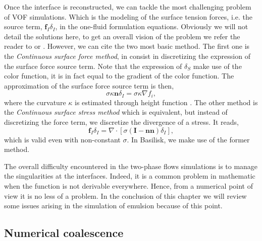 Once the interface is reconstructed, we can tackle the most challenging problem of VOF simulations.
Which is the modeling of the surface tension forces, i.e. the source term, $\textbf{f}_I\delta_I$, in the one-fluid formulation equations.
Obviously we will not detail the solutions here, to get an overall vision of the problem we refer the reader to \citet{popinet2018numerical} or  \citet[Chapter 7]{tryggvason2011direct}.
However, we can cite the two most basic method.
The first one is the \textit{Continuous surface force method}, in consist in discretizing the expression of the surface force source term. 
Note that the expression of $\delta_S$ make use of the color function, it is in fact equal to the gradient of the color function. 
The approximation of the surface force source term is then,
\begin{equation}
    \sigma \kappa  \textbf{n} \delta_I 
    = \sigma \kappa \nabla f_i,
\end{equation}
where the curvature $\kappa$ is estimated through height function \citep{popinet2018numerical}. 
The other method is the \textit{Continuous surface stress method} which is equivalent, but instead of discretizing the force term, we discretize the divergence of a stress.
It reads, 
\begin{equation}
    \textbf{f}_I \delta_I = \nabla \cdot \left[\sigma (\textbf{I}-\textbf{nn})\delta_I\right],
\end{equation}
which is valid even with non-constant $\sigma$. 
In Basilisk, we make use of the former method. 

The overall difficulty encountered in the two-phase flows simulations is to manage the singularities at the interfaces.
Indeed, it is a common problem in mathematic when the function is not derivable everywhere.
Hence, from a numerical point of view it is no less of a problem. 
In the conclusion of this chapter we will review some issues arising in  the simulation of emulsion because of this point. 

\subsection{Numerical coalescence}


